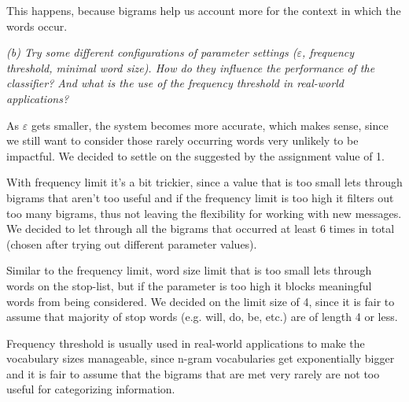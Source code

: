 \documentclass{article}
\begin{document}
This happens, because bigrams help us account more for the context in which the words occur.

\textit{(b) Try some different configurations of parameter settings ($\varepsilon$, frequency threshold, minimal word size). How do they influence the performance of the classifier? And what is the use of the frequency threshold in real-world applications?}

As $\varepsilon$ gets smaller, the system becomes more accurate, which makes sense, since we still want to consider those rarely occurring words very unlikely to be impactful. We decided to settle on the suggested by the assignment value of 1.

With frequency limit it's a bit trickier, since a value that is too small lets through bigrams that aren't too useful and if the frequency limit is too high it filters out too many bigrams, thus not leaving the flexibility for working with new messages. We decided to let through all the bigrams that occurred at least 6 times in total (chosen after trying out different parameter values).

Similar to the frequency limit, word size limit that is too small lets through words on the stop-list, but if the parameter is too high it blocks meaningful words from being considered. We decided on the limit size of 4, since it is fair to assume that majority of stop words (e.g. will, do, be, etc.) are of length 4 or less.

Frequency threshold is usually used in real-world applications to make the vocabulary sizes manageable, since n-gram vocabularies get exponentially bigger and it is fair to assume that the bigrams that are met very rarely are not too useful for categorizing information.
\end{document}
